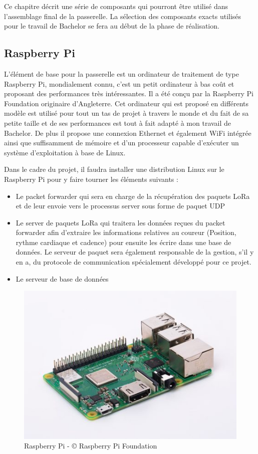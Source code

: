 Ce chapitre décrit une série de composants qui pourront être utilisé dans l’assemblage final de la passerelle. La sélection des composants exacts utilisés pour le travail de Bachelor se fera au début de la phase de réalisation.

\subsection{Raspberry Pi}

L’élément de base pour la passerelle est un ordinateur de traitement de type Raspberry Pi, mondialement connu, c’est un petit ordinateur à bas coût et proposant des performances très intéressantes. Il a été conçu par la Raspberry Pi Foundation originaire d’Angleterre. Cet ordinateur qui est proposé en différents modèle est utilisé pour tout un tas de projet à travers le monde et du fait de sa petite taille et de ses performances est tout à fait adapté à mon travail de Bachelor. De plus il propose une connexion Ethernet et également WiFi intégrée ainsi que suffisamment de mémoire et d’un processeur capable d’exécuter un système d’exploitation à base de Linux.

Dans le cadre du projet, il faudra installer une distribution Linux sur le Raspberry Pi pour y faire tourner les éléments suivants :

\begin{itemize}
\item Le packet forwarder qui sera en charge de la récupération des paquets LoRa et de leur envoie vers le processus server sous forme de paquet UDP
\item Le server de paquets LoRa qui traitera les données reçues du packet forwarder afin d’extraire les informations relatives au coureur (Position, rythme cardiaque et cadence) pour ensuite les écrire dans une base de données. Le serveur de paquet sera également responsable de la gestion, s’il y en a, du protocole de communication spécialement développé pour ce projet.
\item Le serveur de base de données
\end{itemize}

\begin{figure}[htb]
\centering 
\includegraphics[width=0.8\columnwidth]{../images/RaspberryPi.jpg} 
\caption[Raspberry Pi]{Raspberry Pi - © Raspberry Pi Foundation}
\label{fig:rpi}
\end{figure}

